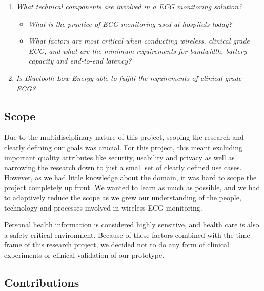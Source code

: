 \label{ssub:research_questions} 
\begin{enumerate}
	
	\item \textit{What technical components are involved in a ECG monitoring solution?} 
	\begin{itemize}
		
		\item \textit{What is the practice of ECG monitoring used at hospitals today?}
		
		\item \textit{What factors are most critical when conducting wireless, clinical grade ECG, and what are the minimum requirements for bandwidth, battery capacity and end-to-end latency?}
	\end{itemize}
	
	\item \textit{Is Bluetooth Low Energy able to fulfill the requirements of clinical grade ECG?}
\end{enumerate}

\subsection{Scope} 

\label{sub:scope}

Due to the multidisciplinary nature of this project, scoping the research and clearly defining our goals was crucial. For this project, this meant excluding important quality attributes like security, usability and privacy as well as narrowing the research down to just a small set of clearly defined use cases. However, as we had little knowledge about the domain, it was hard to scope the project completely up front. We wanted to learn as much as possible, and we had to adaptively reduce the scope as we grew our understanding of the people, technology and processes involved in wireless ECG monitoring. 

Personal health information is considered highly sensitive, and health care is also a safety critical environment. Because of these factors combined with the time frame of this research project, we decided not to do any form of clinical experiments or clinical validation of our prototype.

\subsection{Contributions}

